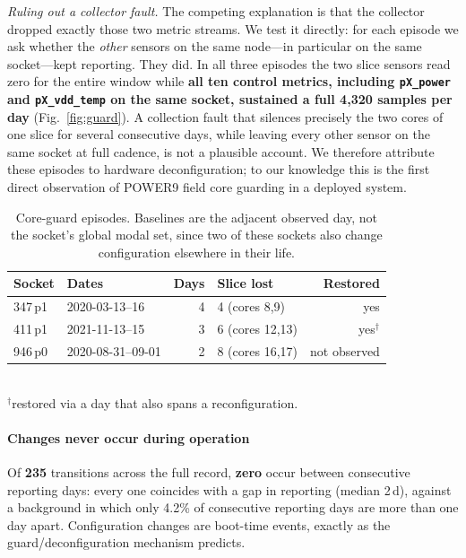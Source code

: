 \documentclass[10pt,conference]{IEEEtran}
\begin{document}
\emph{Ruling out a collector fault.} The competing explanation is that the collector dropped
exactly those two metric streams. We test it directly: for each episode we ask whether the
\emph{other} sensors on the same node---in particular on the same socket---kept reporting. They
did. In all three episodes the two slice sensors read zero for the entire window while
\textbf{all ten control metrics, including \texttt{pX\_power} and \texttt{pX\_vdd\_temp} on the
same socket, sustained a full 4{,}320 samples per day} (Fig.~\ref{fig:guard}). A collection fault
that silences precisely the two cores of one slice for several consecutive days, while leaving
every other sensor on the same socket at full cadence, is not a plausible account. We therefore
attribute these episodes to hardware deconfiguration; to our knowledge this is the first direct
observation of POWER9 field core guarding in a deployed system.

\begin{table}[h]\centering\caption{Core-guard episodes. Baselines are the adjacent observed day,
not the socket's global modal set, since two of these sockets also change configuration elsewhere
in their life.}\label{tab:guard}
\begin{tabular}{llrlr}\toprule
Socket & Dates & Days & Slice lost & Restored\\\midrule
347\,p1 & 2020-03-13--16 & 4 & 4 (cores 8,9)   & yes\\
411\,p1 & 2021-11-13--15 & 3 & 6 (cores 12,13) & yes$^\dagger$\\
946\,p0 & 2020-08-31--09-01 & 2 & 8 (cores 16,17) & not observed\\
\bottomrule\end{tabular}
\\[2pt]\footnotesize$^\dagger$restored via a day that also spans a reconfiguration.
\end{table}

\paragraph{Changes never occur during operation} Of \textbf{235} transitions across the full
record, \textbf{zero} occur between consecutive reporting days: every one coincides with a gap in
reporting (median 2\,d), against a background in which only 4.2\% of consecutive reporting days
are more than one day apart. Configuration changes
are boot-time events, exactly as the guard/deconfiguration mechanism predicts.
\end{document}
